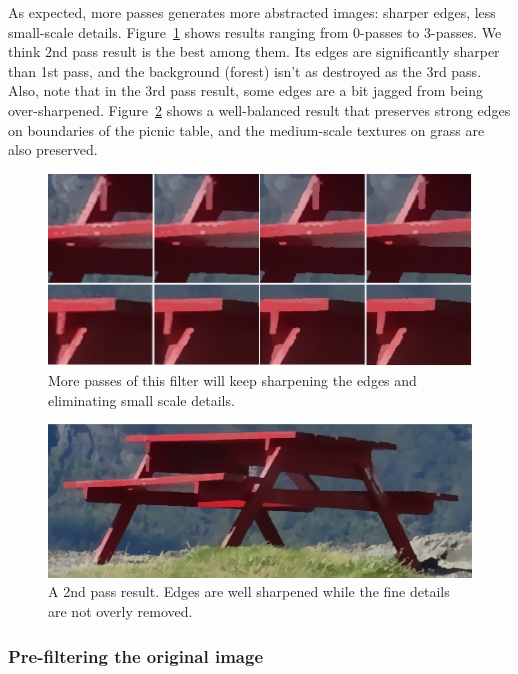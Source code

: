 As expected, more passes generates more abstracted images: sharper edges, less small-scale details.  Figure~\ref{fig:multipass} shows results ranging from 0-passes to 3-passes. We think 2nd pass result is the best among them. Its edges are significantly sharper than 1st pass, and the background (forest) isn't as destroyed as the 3rd pass. Also, note that in the 3rd pass result, some edges are a bit jagged from being over-sharpened.  Figure~\ref{fig:2ndPassResult} shows a well-balanced result that preserves strong edges on boundaries of the picnic table, and the medium-scale textures on grass are also preserved.

\begin{figure}[htbp]
\includegraphics[width=1.0\textwidth]{f10}
\caption{More passes of this filter will keep sharpening the edges and eliminating small scale details. }
\label{fig:multipass}
\end{figure}
\begin{figure}[htbp]
\includegraphics[width=1.0\textwidth]{f11}
\caption{A 2nd pass result. Edges are well sharpened while the fine details are not overly removed.}
\label{fig:2ndPassResult}
\end{figure}

\subsubsection{Pre-filtering the original image}


